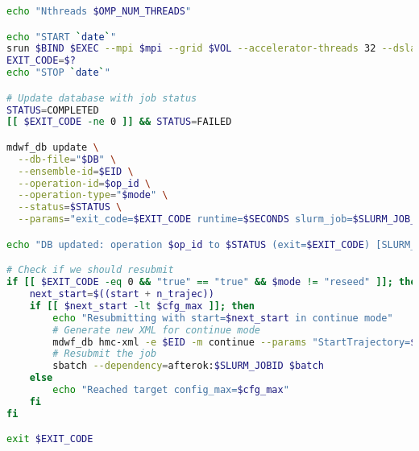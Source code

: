 \documentclass{article}
\begin{document}
\begin{lstlisting}[language=bash]
echo "Nthreads $OMP_NUM_THREADS"

echo "START `date`"
srun $BIND $EXEC --mpi $mpi --grid $VOL --accelerator-threads 32 --dslash-unroll --shm 2048 --comms-overlap -shm-mpi 0 > ../log_hmc/log_b2.10_b1.0Ls32_mc0.04_ms0.04_ml0.005_L24_T48.$start
EXIT_CODE=$?
echo "STOP `date`"

# Update database with job status
STATUS=COMPLETED
[[ $EXIT_CODE -ne 0 ]] && STATUS=FAILED

mdwf_db update \
  --db-file="$DB" \
  --ensemble-id=$EID \
  --operation-id=$op_id \
  --operation-type="$mode" \
  --status=$STATUS \
  --params="exit_code=$EXIT_CODE runtime=$SECONDS slurm_job=$SLURM_JOB_ID host=$(hostname)"

echo "DB updated: operation $op_id to $STATUS (exit=$EXIT_CODE) [SLURM_JOB_ID=$SLURM_JOB_ID]"

# Check if we should resubmit
if [[ $EXIT_CODE -eq 0 && "true" == "true" && $mode != "reseed" ]]; then
    next_start=$((start + n_trajec))
    if [[ $next_start -lt $cfg_max ]]; then
        echo "Resubmitting with start=$next_start in continue mode"
        # Generate new XML for continue mode
        mdwf_db hmc-xml -e $EID -m continue --params "StartTrajectory=$next_start Trajectories=$n_trajec"
        # Resubmit the job
        sbatch --dependency=afterok:$SLURM_JOBID $batch
    else
        echo "Reached target config_max=$cfg_max"
    fi
fi

exit $EXIT_CODE
\end{lstlisting}
\end{document}
